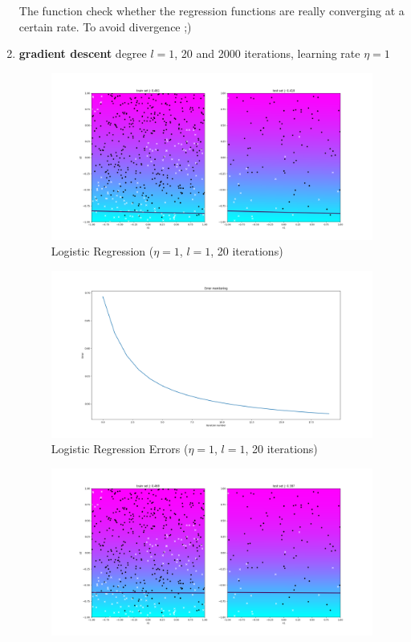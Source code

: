 \documentclass[12pt,halfline,a4paper]{ouparticle}
\begin{document}
\begin{enumerate}
  The function check whether the regression functions are really converging at a
  certain rate. To avoid divergence ;)
  \item \textbf{gradient descent} degree $l = 1$, 20 and 2000 iterations,
  learning rate $\eta = 1$
  	\begin{figure}[H]
  	\centering
	        \includegraphics[width=\textwidth]{figures/logreg_d5_it20_1.png}
	    \caption{Logistic Regression ($\eta = 1$, $l = 1$, 20 iterations)}
	\end{figure}
	\begin{figure}[H]
  	\centering
	        \includegraphics[width=\textwidth]{figures/logreg_d5_it20_1_error.png}
	    \caption{Logistic Regression Errors ($\eta = 1$, $l = 1$, 20 iterations)}
	\end{figure}
	\begin{figure}[H]
  	\centering
	        \includegraphics[width=\textwidth]{figures/logreg_d5_it2000_1.png}

\end{figure}
\end{enumerate}
\end{document}
